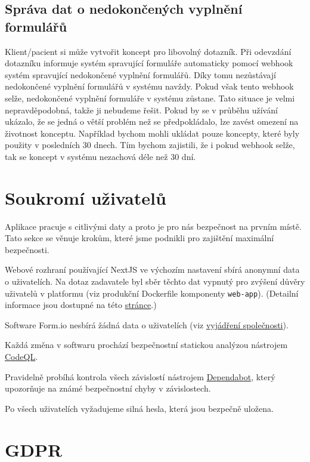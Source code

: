 \subsection{Správa dat o nedokončených vyplnění formulářů}\label{subsec:sprava-dat-o-nedokoncenych-vyplneni-formularu}

Klient/pacient si může vytvořit koncept pro libovolný dotazník.
Při odevzdání dotazníku informuje systém spravující formuláře automaticky pomocí webhook systém spravující nedokončené vyplnění formulářů.
Díky tomu nezůstávají nedokončené vyplnění formulářů v systému navždy.
Pokud však tento webhook selže, nedokončené vyplnění formuláře v systému zůstane.
Tato situace je velmi nepravděpodobná, takže ji nebudeme řešit.
Pokud by se v průběhu užívání ukázalo, že se jedná o větší problém než se předpokládalo, lze zavést omezení na životnost konceptu.
Například bychom mohli ukládat pouze koncepty, které byly použity v posledních 30 dnech.
Tím bychom zajistili, že i pokud webhook selže, tak se koncept v systému nezachová déle než 30 dní.


\section{Soukromí uživatelů}\label{sec:soukromi-uzivatelu}

Aplikace pracuje s citlivými daty a proto je pro nás bezpečnost na prvním místě.
Tato sekce se věnuje krokům, které jsme podnikli pro zajištění maximální bezpečnosti.

Webové rozhraní používající NextJS ve výchozím nastavení sbírá anonymní data o uživatelích.
Na dotaz zadavatele byl sběr těchto dat vypnutý pro zvýšení důvěry uživatelů v platformu (viz produkční Dockerfile komponenty \texttt{web-app}).
(Detailní informace jsou dostupné na této \href{https://nextjs.org/telemetry}{stránce}.)

Software Form.io nesbírá žádná data o uživatelích (viz \href{https://github.com/formio/formio/issues/1499}{vyjádření společnosti}).

Každá změna v softwaru prochází bezpečnostní statickou analýzou nástrojem \href{https://codeql.github.com/}{CodeQL}.

Pravidelně probíhá kontrola všech závislostí nástrojem \href{https://github.com/dependabot}{Dependabot}, který upozorňuje na známé bezpečnostní chyby v závislostech.

Po všech uživatelích vyžadujeme silná hesla, která jsou bezpečně uložena.


\section{GDPR}\label{sec:gdpr}

